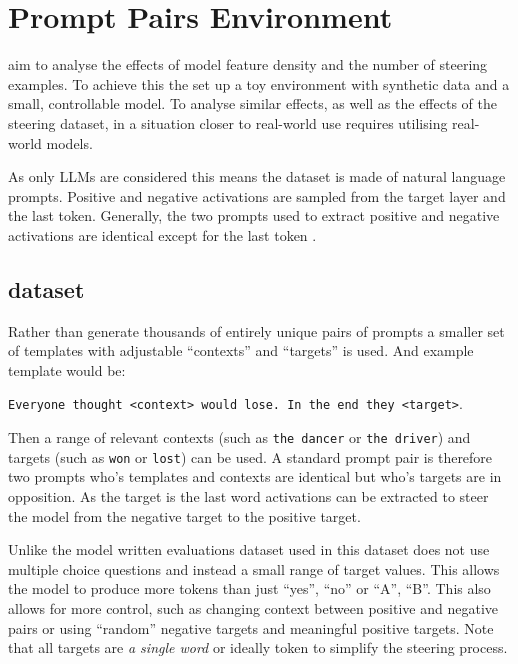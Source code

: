 \section{Prompt Pairs Environment}
\label{sec:prompt-pairs}

\citet{steering-clear} aim to analyse the effects of model feature density and the number of steering examples.
To achieve this the set up a toy environment with synthetic data and a small, controllable model.
To analyse similar effects, as well as the effects of the steering dataset, in a situation closer to real-world use requires utilising real-world models.

As only LLMs are considered this means the dataset is made of natural language prompts.
Positive and negative activations are sampled from the target layer and the last token.
Generally, the two prompts used to extract positive and negative activations are identical except for the last token \citep{steerability, icv, activation-addition}.

\subsection{dataset}

Rather than generate thousands of entirely unique pairs of prompts a smaller set of templates with adjustable ``contexts'' and ``targets'' is used.
And example template would be:

\texttt{Everyone thought <context> would lose. In the end they <target>}.

Then a range of relevant contexts (such as \texttt{the dancer} or \texttt{the driver}) and targets (such as \texttt{won} or \texttt{lost}) can be used.
A standard prompt pair is therefore two prompts who's templates and contexts are identical but who's targets are in opposition.
As the target is the last word activations can be extracted to steer the model from the negative target to the positive target.

Unlike the model written evaluations \citep{mwe} dataset used in \citet{steerability} this dataset does not use multiple choice questions and instead a small range of target values.
This allows the model to produce more tokens than just ``yes'', ``no'' or ``A'', ``B''.
This also allows for more control, such as changing context between positive and negative pairs or using ``random'' negative targets and meaningful positive targets.
Note that all targets are \emph{a single word} or ideally token to simplify the steering process.

